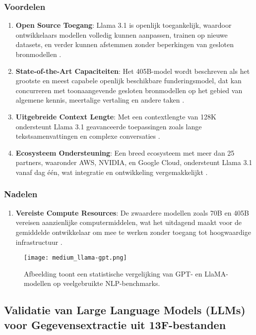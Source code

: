\subsubsection{Voordelen}
\begin{enumerate}
    \item \textbf{Open Source Toegang}: Llama 3.1 is openlijk toegankelijk, waardoor ontwikkelaars modellen volledig kunnen aanpassen, trainen op nieuwe datasets, en verder kunnen afstemmen zonder beperkingen van gesloten bronmodellen \autocite{meta}.
    \item \textbf{State-of-the-Art Capaciteiten}: Het 405B-model wordt beschreven als het grootste en meest capabele openlijk beschikbare funderingsmodel, dat kan concurreren met toonaangevende gesloten bronmodellen op het gebied van algemene kennis, meertalige vertaling en andere taken \autocite{meta}.
    \item \textbf{Uitgebreide Context Lengte}: Met een contextlengte van 128K ondersteunt Llama 3.1 geavanceerde toepassingen zoals lange tekstsamenvattingen en complexe conversaties \autocite{meta}.
    \item \textbf{Ecosysteem Ondersteuning}: Een breed ecosysteem met meer dan 25 partners, waaronder AWS, NVIDIA, en Google Cloud, ondersteunt Llama 3.1 vanaf dag één, wat integratie en ontwikkeling vergemakkelijkt \autocite{meta}.
\end{enumerate}

\subsubsection{Nadelen}
\begin{enumerate}
    \item \textbf{Vereiste Compute Resources}: De zwaardere modellen zoals 70B en 405B vereisen aanzienlijke computermiddelen, wat het uitdagend maakt voor de gemiddelde ontwikkelaar om mee te werken zonder toegang tot hoogwaardige infrastructuur \autocite{meta}.
\end{enumerate}

\begin{figure}[hbt!]
    \texttt{[image: medium\_llama-gpt.png]}
    \caption[13F voorbeeld 4]{\label{fig:gpt-versus-llama-benchmarks} Afbeelding toont een statistische vergelijking van GPT- en LlaMA-modellen op veelgebruikte NLP-benchmarks. \autocite{ResearchGRaph2024}}
\end{figure}

\subsection{Validatie van Large Language Models (LLMs) voor Gegevensextractie uit 13F-bestanden}

